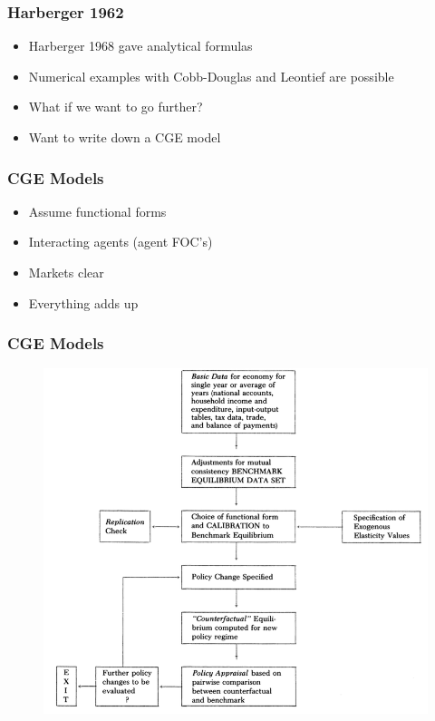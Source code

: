 \documentclass{beamer}
\begin{document}
\begin{frame}
\frametitle[alignment=center]{Harberger 1962}
\begin{itemize}
\item Harberger 1968 gave analytical formulas
\bigskip
\item Numerical examples with Cobb-Douglas and Leontief are possible
\bigskip
\item  What if we want to go further?
\bigskip
\item Want to write down a CGE model
\end{itemize}
\end{frame}

\begin{frame}
\frametitle[alignment=center]{CGE Models}
\begin{itemize}
\item Assume functional forms
\bigskip
\item Interacting agents (agent FOC's)
\bigskip
\item Markets clear
\bigskip
\item Everything adds up
\end{itemize}
\end{frame}

\begin{frame}
\frametitle[alignment=center]{CGE Models}
\begin{figure}
\centering
\includegraphics[scale=0.34]{Shoven_Whalley_1984.png}
\end{figure}
\end{frame}
\end{document}
